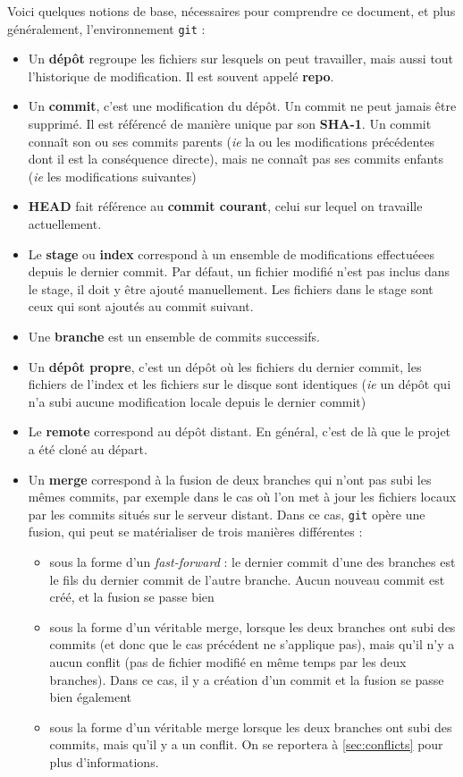 \documentclass[french]{report}
\newcommand\itemb{\item[$\bullet$]}
\begin{document}
Voici quelques notions de base, nécessaires pour comprendre ce document, et plus généralement, l'environnement \texttt{git} :
\begin{itemize}
    \itemb Un \textbf{dépôt} regroupe les fichiers sur lesquels on peut travailler, mais aussi tout l'historique de modification. Il est souvent appelé \textbf{repo}.
    \itemb Un \textbf{commit}, c'est une modification du dépôt.
    Un commit ne peut jamais être supprimé.
    Il est référencé de manière unique par son \textbf{SHA-1}.
    Un commit connaît son ou ses commits parents (\textit{ie} la ou les modifications précédentes dont il est la conséquence directe), mais ne connaît pas ses commits enfants (\textit{ie} les modifications suivantes)
    \itemb \textbf{HEAD} fait référence au \textbf{commit courant}, celui sur lequel on travaille actuellement.
    \itemb Le \textbf{stage} ou \textbf{index} correspond à un ensemble de modifications effectuéees depuis le dernier commit.
    Par défaut, un fichier modifié n'est pas inclus dans le stage, il doit y être ajouté manuellement.
    Les fichiers dans le stage sont ceux qui sont ajoutés au commit suivant.
    \itemb Une \textbf{branche} est un ensemble de commits successifs.
    \itemb Un \textbf{dépôt propre}, c'est un dépôt où les fichiers du dernier commit, les fichiers de l'index et les fichiers sur le disque sont identiques (\textit{ie} un dépôt qui n'a subi aucune modification locale depuis le dernier commit)
    \itemb Le \textbf{remote} correspond au dépôt distant. En général, c'est de là que le projet a été cloné au départ.
    \itemb Un \textbf{merge} correspond à la fusion de deux branches qui n'ont pas subi les mêmes commits, par exemple dans le cas où l'on met à jour les fichiers locaux par les commits situés sur le serveur distant.
    Dans ce cas, \texttt{git} opère une fusion, qui peut se matérialiser de trois manières différentes :
    \begin{itemize}
        \item sous la forme d'un \textit{fast-forward} : le dernier commit d'une des branches est le fils du dernier commit de l'autre branche.
        Aucun nouveau commit est créé, et la fusion se passe bien
        \item sous la forme d'un véritable merge, lorsque les deux branches ont subi des commits (et donc que le cas précédent ne s'applique pas), mais qu'il n'y a aucun conflit (pas de fichier modifié en même temps par les deux branches).
        Dans ce cas, il y a création d'un commit et la fusion se passe bien également
        \item sous la forme d'un véritable merge lorsque les deux branches ont subi des commits, mais qu'il y a un conflit. On se reportera à \ref{sec:conflicts} pour plus d'informations.
    \end{itemize}
\end{itemize}
\end{document}
